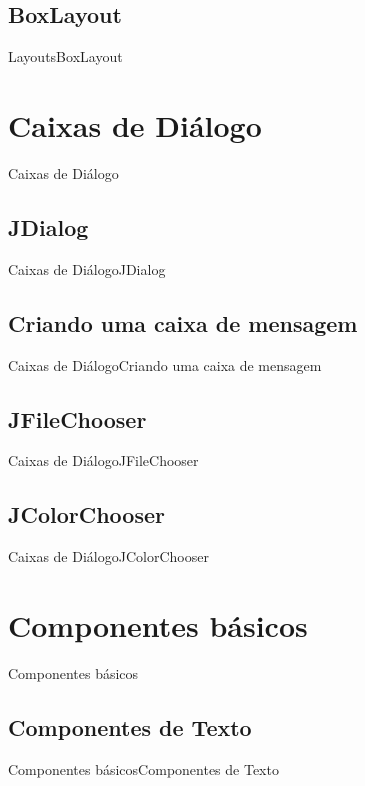 \documentclass[10pt]{beamer}
\begin{document}
\subsection{BoxLayout}
\begin{frame}{Layouts}{BoxLayout}
\end{frame}{}


\section{Caixas de Diálogo}
\begin{frame}{Caixas de Diálogo}{}
\end{frame}{}

\subsection{JDialog}
\begin{frame}{Caixas de Diálogo}{JDialog}
\end{frame}{}
\subsection{Criando uma caixa de mensagem}
\begin{frame}{Caixas de Diálogo}{Criando uma caixa de mensagem}
\end{frame}{}

\subsection{JFileChooser}
\begin{frame}{Caixas de Diálogo}{JFileChooser}
\end{frame}{}

\subsection{JColorChooser}
\begin{frame}{Caixas de Diálogo}{JColorChooser}
\end{frame}{}


\section{Componentes básicos}
\begin{frame}{Componentes básicos}{}
\end{frame}{}

\subsection{Componentes de Texto}
\begin{frame}{Componentes básicos}{Componentes de Texto}
\end{frame}{}
\end{document}
